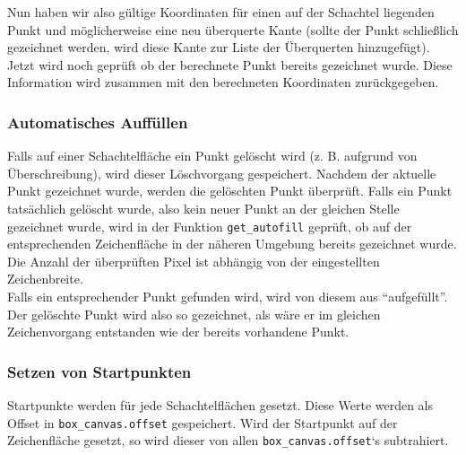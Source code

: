 Nun haben wir also gültige Koordinaten für einen auf der Schachtel liegenden Punkt und möglicherweise eine neu überquerte Kante (sollte der Punkt schließlich gezeichnet werden, wird diese Kante zur Liste der Überquerten hinzugefügt). Jetzt wird noch geprüft ob der berechnete Punkt bereits gezeichnet wurde. Diese Information wird zusammen mit den berechneten Koordinaten zurückgegeben.\\


\subsubsection{Automatisches Auffüllen}
\label{subsubsec:auffuellen}

Falls auf einer Schachtelfläche ein Punkt gelöscht wird (z. B. aufgrund von Überschreibung), wird dieser Löschvorgang gespeichert. Nachdem der aktuelle Punkt gezeichnet wurde, werden die gelöschten Punkt überprüft. Falls ein Punkt tatsächlich gelöscht wurde, also kein neuer Punkt an der gleichen Stelle gezeichnet wurde, wird in der Funktion \texttt{get\_autofill} geprüft, ob auf der entsprechenden Zeichenfläche in der näheren Umgebung bereits gezeichnet wurde. Die Anzahl der überprüften Pixel ist abhängig von der eingestellten Zeichenbreite.\\

Falls ein entsprechender Punkt gefunden wird, wird von diesem aus "`aufgefüllt"'. Der gelöschte Punkt wird also so gezeichnet, als wäre er im gleichen Zeichenvorgang entstanden wie der bereits vorhandene Punkt.\\ 


\subsubsection{Setzen von Startpunkten}
\label{subsubsec:startpunkte}
Startpunkte werden für jede Schachtelflächen gesetzt. Diese Werte werden als Offset in \texttt{box\_canvas.offset} gespeichert. Wird der Startpunkt auf der Zeichenfläche gesetzt, so wird dieser von allen \texttt{box\_canvas.offset}`s subtrahiert.


